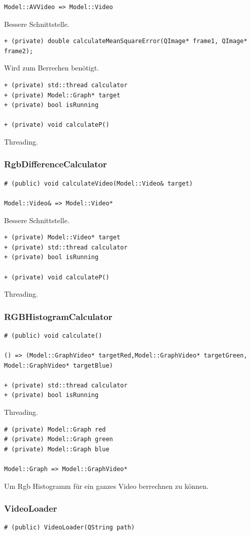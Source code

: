 \documentclass{scrartcl}
\begin{document}
{\begin{verbatim}
Model::AVVideo => Model::Video
\end{verbatim}
Bessere Schnittstelle.
\begin{verbatim}
+ (private) double calculateMeanSquareError(QImage* frame1, QImage* frame2);
\end{verbatim}
Wird zum Berrechen benötigt.
\bigskip
\begin{verbatim}
+ (private) std::thread calculator
+ (private) Model::Graph* target
+ (private) bool isRunning

+ (private) void calculateP()
\end{verbatim}
Threading.
\bigskip
\subsubsection{RgbDifferenceCalculator}
\begin{verbatim}
# (public) void calculateVideo(Model::Video& target)

Model::Video& => Model::Video*
\end{verbatim}
Bessere Schnittstelle.
\bigskip
\begin{verbatim}
+ (private) Model::Video* target
+ (private) std::thread calculator
+ (private) bool isRunning

+ (private) void calculateP()
\end{verbatim}
Threading.
\newpage
\subsubsection{RGBHistogramCalculator}
\begin{verbatim}
# (public) void calculate()

() => (Model::GraphVideo* targetRed,Model::GraphVideo* targetGreen, 
Model::GraphVideo* targetBlue)

+ (private) std::thread calculator
+ (private) bool isRunning
\end{verbatim}
Threading.
\bigskip
\begin{verbatim}
# (private) Model::Graph red
# (private) Model::Graph green
# (private) Model::Graph blue

Model::Graph => Model::GraphVideo*
\end{verbatim}
Um Rgb Histogramm für ein ganzes Video berrechnen zu können.
\bigskip
\subsubsection{VideoLoader}
\begin{verbatim}
# (public) VideoLoader(QString path)


\end{verbatim}}
\end{document}
